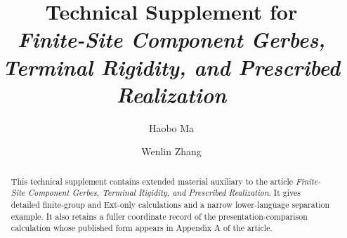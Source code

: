 \documentclass[12pt,reqno]{amsart}
\title[Technical Supplement]{Technical Supplement for\\
  \emph{Finite-Site Component Gerbes, Terminal Rigidity, and Prescribed Realization}}
\author{Haobo Ma}
\author{Wenlin Zhang}
\theoremstyle{definition}
\theoremstyle{remark}
\begin{document}
\begin{abstract}
This technical supplement contains extended material auxiliary to the article
\emph{Finite-Site Component Gerbes, Terminal Rigidity, and Prescribed
Realization}.  It gives detailed finite-group and Ext-only calculations and a
narrow lower-language separation example.  It also retains a fuller
coordinate record of the presentation-comparison calculation whose published
form appears in Appendix A of the article.
\end{abstract}

\maketitle
\appendix

\end{document}
